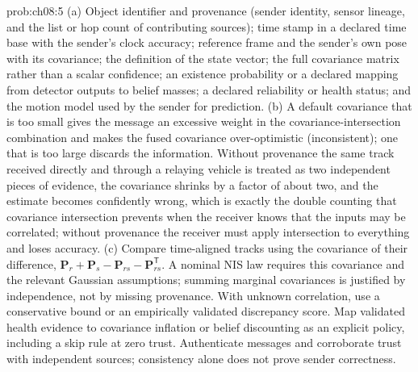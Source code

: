 \begin{sol}{prob:ch08:5}
(a) Object identifier and provenance (sender identity, sensor lineage, and the list or hop count of contributing sources); time stamp in a declared time base with the sender's clock accuracy; reference frame and the sender's own pose with its covariance; the definition of the state vector; the full covariance matrix rather than a scalar confidence; an existence probability or a declared mapping from detector outputs to belief masses; a declared reliability or health status; and the motion model used by the sender for prediction. (b) A default covariance that is too small gives the message an excessive weight in the covariance-intersection combination and makes the fused covariance over-optimistic (inconsistent); one that is too large discards the information. Without provenance the same track received directly and through a relaying vehicle is treated as two independent pieces of evidence, the covariance shrinks by a factor of about two, and the estimate becomes confidently wrong, which is exactly the double counting that covariance intersection prevents when the receiver knows that the inputs may be correlated; without provenance the receiver must apply intersection to everything and loses accuracy. (c) Compare time-aligned tracks using the covariance of their difference, $\mathbf{P}_r+\mathbf{P}_s-\mathbf{P}_{rs}-\mathbf{P}_{rs}^{\mathsf T}$. A nominal NIS law requires this covariance and the relevant Gaussian assumptions; summing marginal covariances is justified by independence, not by missing provenance. With unknown correlation, use a conservative bound or an empirically validated discrepancy score. Map validated health evidence to covariance inflation or belief discounting as an explicit policy, including a skip rule at zero trust. Authenticate messages and corroborate trust with independent sources; consistency alone does not prove sender correctness.
\end{sol}

